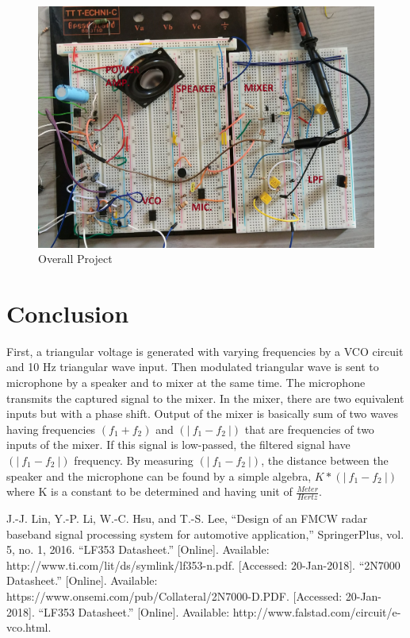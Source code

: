 \documentclass[paper]{IEEEtran}
\begin{document}
\begin{figure}[h!]
\setlength{\unitlength}{\textwidth}
\center 
\includegraphics[width=1.0\unitlength]{overall_cct2.jpg}
\caption{\label{fig:overall}Overall Project }
\end{figure}	

\section{Conclusion}

	First, a triangular voltage is generated with varying frequencies by a VCO circuit and 10 Hz triangular wave input. Then modulated triangular wave is sent to microphone by a speaker and to mixer at the same time. The microphone transmits the captured signal to the mixer. In the mixer, there are two equivalent inputs but with a phase shift. Output of the mixer is basically sum of two waves having frequencies $ (f_1+f_2)$ and $(|~f_1 -f_2~|) $ that are frequencies of two inputs of the mixer. If this signal is low-passed, the filtered signal have $(|~f_1 -f_2~|) $ frequency. By measuring $(|~f_1 -f_2~|) $, the distance between the speaker and the microphone can be found by a simple algebra, $K*(|~f_1 -f_2~|) $ where K is a constant to be determined and having unit of $\frac{Meter}{Hertz} $.

 


\begin{thebibliography}{00}
 J.-J. Lin, Y.-P. Li, W.-C. Hsu, and T.-S. Lee, “Design of an FMCW radar baseband signal processing system for automotive application,” SpringerPlus, vol. 5, no. 1, 2016.	
 “LF353 Datasheet.” [Online]. Available: http://www.ti.com/lit/ds/symlink/lf353-n.pdf. [Accessed: 20-Jan-2018].
 “2N7000 Datasheet.” [Online]. Available: https://www.onsemi.com/pub/Collateral/2N7000-D.PDF. [Accessed: 20-Jan-2018].
 “LF353 Datasheet.” [Online]. Available: http://www.falstad.com/circuit/e-vco.html.

\end{thebibliography}
\end{document}
